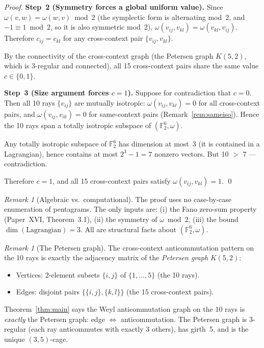 \documentclass[11pt,a4paper]{article}
\theoremstyle{remark}
\newtheorem{remark}[theorem]{Remark}
\begin{document}
\begin{proof}
\textbf{Step~2 (Symmetry forces a global uniform value).}
Since $\omega(v,w) = \omega(w,v) \bmod 2$ (the symplectic form is
alternating mod~2, and $-1 \equiv 1 \bmod 2$, so it is also symmetric mod~2),
$\omega(v_{ij}, v_{kl}) = \omega(v_{kl}, v_{ij})$.
Therefore $c_{ij} = c_{kl}$ for any cross-context pair $\{v_{ij}, v_{kl}\}$.

By the connectivity of the cross-context graph
(the Petersen graph $K(5,2)$, which is 3-regular and connected),
all 15 cross-context pairs share the same value $c \in \{0,1\}$.

\textbf{Step~3 (Size argument forces $c = 1$).}
Suppose for contradiction that $c = 0$.
Then all 10 rays $\{v_{ij}\}$ are mutually isotropic:
$\omega(v_{ij}, v_{kl}) = 0$ for all cross-context pairs,
and $\omega(v_{ij}, v_{ik}) = 0$ for same-context pairs (Remark~\ref{rem:sameiso}).
Hence the 10 rays span a totally isotropic subspace of $(\mathbb{F}_2^6, \omega)$.

Any totally isotropic subspace of $\mathbb{F}_2^6$ has dimension at most~3
(it is contained in a Lagrangian), hence contains at most
$2^3 - 1 = 7$ nonzero vectors.
But 10 $>$ 7 --- contradiction.

Therefore $c = 1$, and all 15 cross-context pairs satisfy
$\omega(v_{ij}, v_{kl}) = 1$. \qed
\end{proof}

\begin{remark}[Algebraic vs.\ computational]
The proof uses no case-by-case enumeration of pentagrams.
The only inputs are:
(i) the Fano zero-sum property (Paper~XVI, Theorem~3.1),
(ii) the symmetry of $\omega \bmod 2$,
(iii) the bound $\dim(\text{Lagrangian}) = 3$.
All are structural facts about $(\mathbb{F}_2^6, \omega)$.
\end{remark}

\begin{remark}[The Petersen graph]\label{rem:petersen}
The cross-context anticommutation pattern on the 10 rays is exactly
the adjacency matrix of the \emph{Petersen graph} $K(5,2)$:
\begin{itemize}
  \item Vertices: 2-element subsets $\{i,j\}$ of $\{1,\ldots,5\}$ (the 10 rays).
  \item Edges: disjoint pairs $\{\{i,j\},\{k,l\}\}$ (the 15 cross-context pairs).
\end{itemize}
Theorem~\ref{thm:main} says the Weyl anticommutation graph on the 10 rays
is \emph{exactly} the Petersen graph: edge $\Leftrightarrow$ anticommutation.
The Petersen graph is 3-regular (each ray anticommutes with exactly 3 others),
has girth~5, and is the unique $(3,5)$-cage.
\end{remark}
\end{document}
